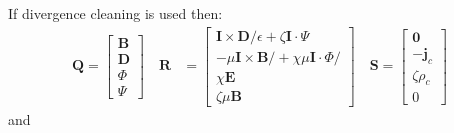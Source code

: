 \documentclass[12pt]{article}
\begin{document}
	If divergence cleaning is used then:
	\begin{align}
		\mathbf{Q} = 
			\begin{bmatrix}
       			\mathbf{B} \\
       			\mathbf{D} \\
       			\Phi \\
       			\Psi 
     		\end{bmatrix} \quad
     	\mathbf{R} &= \begin{bmatrix}
       			\mathbf{I} \times \mathbf{D}/\epsilon + \zeta \mathbf{I}\cdot \Psi\\
       		    -\mu \mathbf{I} \times \mathbf{B}/ + \chi \mu\mathbf{I}\cdot \Phi/ \\
       		    \chi \mathbf{E}\\
       		    \zeta\mu\mathbf{B}
     		\end{bmatrix} \quad
     	\mathbf{S} = \begin{bmatrix}
     			\mathbf{0} \\
       			-\mathbf{j}_c \\
       			\zeta \rho_c \\ 
       			0
     		\end{bmatrix}
	\end{align}
	and 
\end{document}
